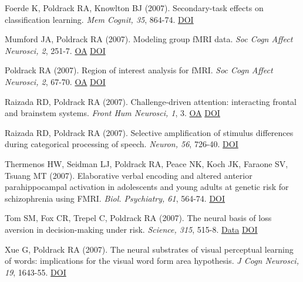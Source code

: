 Foerde K, Poldrack RA, Knowlton BJ (2007). Secondary-task effects on classification learning. \textit{Mem Cognit, 35}, 864-74. \href{http://dx.doi.org/10.3758/bf03193461}{DOI} \vspace{2mm}

Mumford JA, Poldrack RA (2007). Modeling group fMRI data. \textit{Soc Cogn Affect Neurosci, 2}, 251-7. \href{https://www.ncbi.nlm.nih.gov/pmc/articles/PMC2569805}{OA} \href{http://dx.doi.org/10.1093/scan/nsm019}{DOI} \vspace{2mm}

Poldrack RA (2007). Region of interest analysis for fMRI. \textit{Soc Cogn Affect Neurosci, 2}, 67-70. \href{https://www.ncbi.nlm.nih.gov/pmc/articles/PMC2555436}{OA} \href{http://dx.doi.org/10.1093/scan/nsm006}{DOI} \vspace{2mm}

Raizada RD, Poldrack RA (2007). Challenge-driven attention: interacting frontal and brainstem systems. \textit{Front Hum Neurosci, 1}, 3. \href{https://www.ncbi.nlm.nih.gov/pmc/articles/PMC2525983}{OA} \href{http://dx.doi.org/10.3389/neuro.09.003.2007}{DOI} \vspace{2mm}

Raizada RD, Poldrack RA (2007). Selective amplification of stimulus differences during categorical processing of speech. \textit{Neuron, 56}, 726-40. \href{http://dx.doi.org/10.1016/j.neuron.2007.11.001}{DOI} \vspace{2mm}

Thermenos HW, Seidman LJ, Poldrack RA, Peace NK, Koch JK, Faraone SV, Tsuang MT (2007). Elaborative verbal encoding and altered anterior parahippocampal activation in adolescents and young adults at genetic risk for schizophrenia using FMRI. \textit{Biol. Psychiatry, 61}, 564-74. \href{http://dx.doi.org/10.1016/j.biopsych.2006.04.044}{DOI} \vspace{2mm}

Tom SM, Fox CR, Trepel C, Poldrack RA (2007). The neural basis of loss aversion in decision-making under risk. \textit{Science, 315}, 515-8. \href{https://openneuro.org/datasets/ds000008/versions/00001}{Data} \href{http://dx.doi.org/10.1126/science.1134239}{DOI} \vspace{2mm}

Xue G, Poldrack RA (2007). The neural substrates of visual perceptual learning of words: implications for the visual word form area hypothesis. \textit{J Cogn Neurosci, 19}, 1643-55. \href{http://dx.doi.org/10.1162/jocn.2007.19.10.1643}{DOI} \vspace{2mm}

